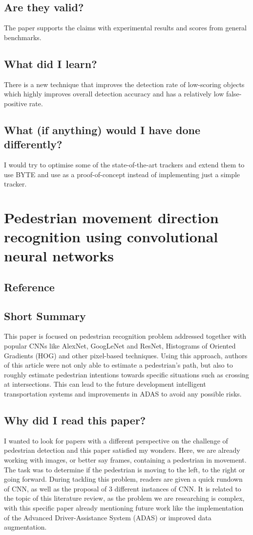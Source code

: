 \documentclass[11pt,a4paper]{article}
\begin{document}
\subsection*{Are they valid?}
The paper supports the claims with experimental results and scores from general benchmarks.
\subsection*{What did I learn?}
There is a new technique that improves the detection rate of low-scoring objects which highly improves overall detection accuracy and has a relatively low false-positive rate.
\subsection*{What (if anything) would I have done differently?}
I would try to optimise some of the state-of-the-art trackers and extend them to use BYTE and use as a proof-of-concept instead of implementing just a simple tracker.
\newpage 


\section*{Pedestrian movement direction recognition using convolutional neural networks}
\subsection*{Reference}

\subsection*{Short Summary} 
This paper is focused on pedestrian recognition problem addressed together with popular CNNs like AlexNet, GoogLeNet and ResNet, Histograms of Oriented Gradients (HOG) and other pixel-based techniques. Using this approach, authors of this article were not only able to estimate a pedestrian’s path, but also to roughly estimate pedestrian intentions towards specific situations such as crossing at intersections. This can lead to the future development intelligent transportation systems and improvements in ADAS to avoid any possible risks.

\subsection*{Why did I read this paper?}
I wanted to look for papers with a different perspective on the challenge of pedestrian detection and this paper satisfied my wonders. Here, we are already working with images, or better say frames, containing a pedestrian in movement. The task was to determine if the pedestrian is moving to the left, to the right or going forward. During tackling this problem, readers are given a quick rundown of CNN, as well as the proposal of 3 different instances of CNN. It is related to the topic of this literature review, as the problem we are researching is complex, with this specific paper already mentioning future work like the implementation of the Advanced Driver-Assistance System (ADAS) or improved data augmentation.
\end{document}
